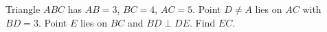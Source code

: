 Triangle $ABC$ has $AB=3$, $BC=4$, $AC=5$. Point $D\ne A$ lies on $AC$ with $BD=3$. Point $E$ lies on $BC$ and $BD\perp DE$. Find $EC$.
